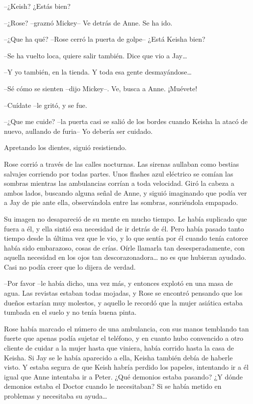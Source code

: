 {--¿Keish? ¿Estás bien?}

{--¿Rose? --graznó Mickey-- Ve detrás de Anne. Se ha ido.}

{--¿Que ha qué? --Rose cerró la puerta de golpe-- ¿Está Keisha bien?}

{--Se ha vuelto loca, quiere salir también. Dice que vio a Jay\ldots{}}

{--Y yo también, en la tienda. Y toda esa gente desmayándose\ldots{}}

{--Sé cómo se sienten --dijo Mickey--. Ve, busca a Anne. ¡Muévete!}

{--Cuídate --le gritó, y se fue.}

{--¿Que me cuide? --la puerta casi se salió de los bordes cuando Keisha
la atacó de nuevo, aullando de furia-- Yo debería ser cuidado.}

{Apretando los dientes, siguió resistiendo.}

\mbox{}

{Rose corrió a través de las calles nocturnas. Las sirenas aullaban como
 bestias salvajes corriendo por todas partes. Unos flashes azul eléctrico
 se comían las sombras mientras las ambulancias corrían a toda velocidad.
 Giró la cabeza a ambos lados, buscando alguna señal de Anne, y siguió
 imaginando que podía ver a Jay de pie ante ella, observándola entre las
sombras, sonriéndola empapado.}

{Su imagen no desapareció de su mente en mucho tiempo. Le había
 suplicado que fuera a él, y ella sintió esa necesidad de ir detrás de
 él. Pero había pasado tanto tiempo desde la última vez que le vio, y lo
 que sentía por él cuando tenía catorce había sido embarazoso, cosas de
 crías. Oírle llamarla tan desesperadamente, con aquella necesidad en los
 ojos tan descorazonadora\ldots{} no es que hubieran ayudado. Casi no
podía creer que lo dijera de verdad.}

{--Por favor --le había dicho, una vez más, y entonces explotó en una
 masa de agua. Las revistas estaban todas mojadas, y Rose se encontró
 pensando que los dueños estarían muy molestos, y aquello le recordó que
la mujer asiática estaba tumbada en el suelo y no tenía buena pinta.}

{Rose había marcado el número de una ambulancia, con sus manos temblando
 tan fuerte que apenas podía sujetar el teléfono, y en cuanto hubo
 convencido a otro cliente de cuidar a la mujer hasta que viniera, había
 corrido hasta la casa de Keisha. Si Jay se le había aparecido a ella,
 Keisha también debía de haberle visto. Y estaba segura de que Keish
 habría perdido los papeles, intentando ir a él igual que Anne intentaba
 ir a Peter. ¿Qué demonios estaba pasando? ¿Y dónde demonios estaba el
 Doctor cuando le necesitaban? Si se había metido en problemas y
 necesitaba su ayuda\ldots{}}

